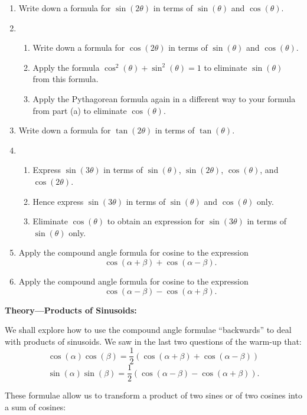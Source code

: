\documentclass{article}
\begin{document}
\begin{enumerate}
\item Write down a formula for $\sin(2\theta)$ in terms of $\sin(\theta)$ and $\cos(\theta)$.
\item \begin{enumerate}
	\item Write down a formula for $\cos(2\theta)$ in terms of $\sin(\theta)$ and $\cos(\theta)$.
	\item Apply the formula $\cos^2(\theta)+\sin^2(\theta)=1$ to eliminate $\sin(\theta)$ from this formula.
	\item Apply the Pythagorean formula again in a different way to your formula from part (a) to eliminate $\cos(\theta)$.
	\end{enumerate}
\item Write down a formula for $\tan(2\theta)$ in terms of $\tan(\theta)$.
\item \begin{enumerate}
	\item Express $\sin(3\theta)$ in terms of $\sin(\theta)$, $\sin(2\theta)$, $\cos(\theta)$, and $\cos(2\theta)$.
	\item Hence express $\sin(3\theta)$ in terms of $\sin(\theta)$ and $\cos(\theta)$ only.
	\item Eliminate $\cos(\theta)$ to obtain an expression for $\sin(3\theta)$ in terms of $\sin(\theta)$ only.
	\end{enumerate}
\item Apply the compound angle formula for cosine to the expression
\[\cos(\alpha+\beta) + \cos(\alpha-\beta).\]
\item Apply the compound angle formula for cosine to the expression
\[\cos(\alpha-\beta) - \cos(\alpha+\beta).\]
\end{enumerate}




\clearpage

\textbf{Theory---Products of Sinusoids:}

\vspace{5mm}

We shall explore how to use the compound angle formulae ``backwards'' to deal with products of sinusoids. We saw in the last two questions of the warm-up that:
\[\cos(\alpha)\cos(\beta)=\frac{1}{2}\left(\cos(\alpha+\beta)+\cos(\alpha-\beta)\right)\]
\[\sin(\alpha)\sin(\beta)=\frac{1}{2}\left(\cos(\alpha-\beta)-\cos(\alpha+\beta)\right).\]

These formulae allow us to transform a product of two sines or of two cosines into a sum of cosines:
\end{document}
